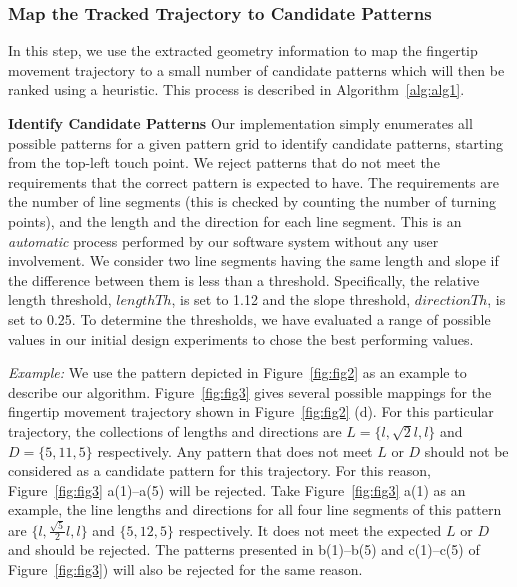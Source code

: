     \subsubsection{Map the Tracked Trajectory to Candidate Patterns\label{section:identity}}
       In this step, we use the extracted geometry information to map the fingertip movement trajectory to a small number of candidate patterns which will then be ranked using a heuristic. This process is described in Algorithm~\ref{alg:alg1}.

       \noindent \textbf{Identify Candidate Patterns} Our implementation simply enumerates all possible
        patterns for a given pattern grid to identify candidate patterns, starting from the top-left touch point.
        We reject patterns that do not meet the requirements that the correct pattern is expected to have. The requirements are the number of line segments (this is checked by counting the number of turning points), and the length and the direction for each
        line segment.
        This is an \emph{automatic} process performed by our software system without any user involvement.
       We consider two line segments having the same length and slope if the difference between them is less
       than a threshold. Specifically, the relative length threshold, $lengthTh$, is set to 1.12 and the slope threshold, $directionTh$, is set to 0.25.
       To determine the thresholds, we have evaluated a range of possible values in our initial design experiments to chose the best performing values.

       \noindent \emph{Example:} We use the pattern depicted in Figure~\ref{fig:fig2} as an example to
       describe our algorithm. Figure~\ref{fig:fig3} gives several
       possible mappings for the fingertip movement trajectory shown in Figure~\ref{fig:fig2} (d). For this particular trajectory, the collections of lengths and directions are
       $L=\{l, \sqrt{2}l, l\}$ and $D=\{5, 11, 5\}$ respectively. Any pattern that does not meet $L$ or $D$ should not be considered as a candidate pattern for this trajectory.
       For this reason, Figure~\ref{fig:fig3} a(1)--a(5) will be rejected. Take Figure~\ref{fig:fig3} a(1) as an example,
       the line lengths and directions for all four line segments of this pattern are  $\{l,
       \frac{\sqrt{5}}{2}l, l\}$ and $\{5,12,5\}$ respectively. It does not meet the expected $L$ or $D$ and should be rejected.
       The patterns presented in b(1)--b(5) and c(1)--c(5) of Figure~\ref{fig:fig3}) will
       also be rejected for the same reason.


